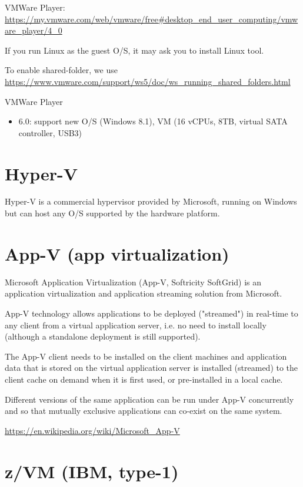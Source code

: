 VMWare Player:
\url{https://my.vmware.com/web/vmware/free#desktop_end_user_computing/vmware_player/4_0}

If you run Linux as the guest O/S, it may ask you to install
Linux tool.

To enable shared-folder, we use
\url{https://www.vmware.com/support/ws5/doc/ws_running_shared_folders.html}

VMWare Player
\begin{itemize}
  \item 6.0: support new O/S (Windows 8.1), VM (16 vCPUs, 8TB, virtual SATA controller, USB3)
\end{itemize}

\section{Hyper-V}
\label{sec:Hyper-V}

Hyper-V is a commercial hypervisor provided by Microsoft, running on Windows but
can host any O/S supported by the hardware platform. 


\section{App-V (app virtualization)}
\label{sec:App-V}

Microsoft Application Virtualization (App-V, Softricity SoftGrid) is an 
application virtualization and application streaming solution from Microsoft.

App-V technology allows applications to be deployed ("streamed") in real-time to
any client from a virtual application server, i.e. no need to install locally
(although a standalone deployment is still supported).

The App-V client needs to be installed on the client machines and application
data that is stored on the virtual application server is installed (streamed) to
the client cache on demand when it is first used, or pre-installed in a local
cache.

Different versions of the same application can be run under App-V concurrently
and so that mutually exclusive applications can co-exist on the same system.

\url{https://en.wikipedia.org/wiki/Microsoft_App-V}

\section{z/VM (IBM, type-1)}

